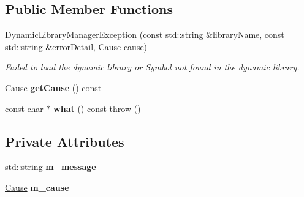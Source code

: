\subsection*{Public Member Functions}
\begin{DoxyCompactItemize}
\item 
\hyperlink{class_dynamic_library_manager_exception_a15629092a054849f1cb73f8f468f8125}{Dynamic\+Library\+Manager\+Exception} (const std\+::string \&library\+Name, const std\+::string \&error\+Detail, \hyperlink{class_dynamic_library_manager_exception_a73b4694c152e0693fbc19fb04987a0b9}{Cause} cause)\hypertarget{class_dynamic_library_manager_exception_a15629092a054849f1cb73f8f468f8125}{}\label{class_dynamic_library_manager_exception_a15629092a054849f1cb73f8f468f8125}

\begin{DoxyCompactList}\small\item\em Failed to load the dynamic library or Symbol not found in the dynamic library. \end{DoxyCompactList}\item 
\hyperlink{class_dynamic_library_manager_exception_a73b4694c152e0693fbc19fb04987a0b9}{Cause} {\bfseries get\+Cause} () const \hypertarget{class_dynamic_library_manager_exception_ab389b721f9a45814b8269ba865a1f25f}{}\label{class_dynamic_library_manager_exception_ab389b721f9a45814b8269ba865a1f25f}

\item 
const char $\ast$ {\bfseries what} () const   throw ()\hypertarget{class_dynamic_library_manager_exception_a3e6ed8a5e743a8ac80e4cb73a5d87360}{}\label{class_dynamic_library_manager_exception_a3e6ed8a5e743a8ac80e4cb73a5d87360}

\end{DoxyCompactItemize}
\subsection*{Private Attributes}
\begin{DoxyCompactItemize}
\item 
std\+::string {\bfseries m\+\_\+message}\hypertarget{class_dynamic_library_manager_exception_ab20ed5158c99e55fb79df36fae19b28e}{}\label{class_dynamic_library_manager_exception_ab20ed5158c99e55fb79df36fae19b28e}

\item 
\hyperlink{class_dynamic_library_manager_exception_a73b4694c152e0693fbc19fb04987a0b9}{Cause} {\bfseries m\+\_\+cause}\hypertarget{class_dynamic_library_manager_exception_afc5a741cd2d8d2fed92fcba47033d145}{}\label{class_dynamic_library_manager_exception_afc5a741cd2d8d2fed92fcba47033d145}

\end{DoxyCompactItemize}


